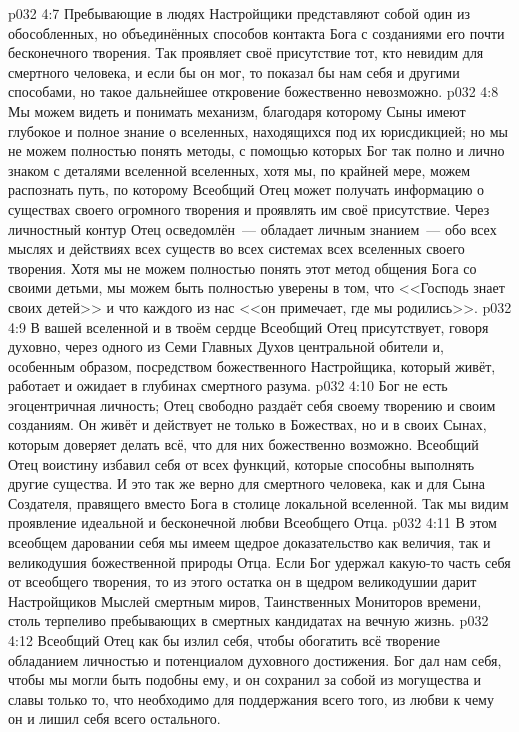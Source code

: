 \vs p032 4:7 Пребывающие в людях Настройщики представляют собой один из обособленных, но объединённых способов контакта Бога с созданиями его почти бесконечного творения. Так проявляет своё присутствие тот, кто невидим для смертного человека, и если бы он мог, то показал бы нам себя и другими способами, но такое дальнейшее откровение божественно невозможно.
\vs p032 4:8 Мы можем видеть и понимать механизм, благодаря которому Сыны имеют глубокое и полное знание о вселенных, находящихся под их юрисдикцией; но мы не можем полностью понять методы, с помощью которых Бог так полно и лично знаком с деталями вселенной вселенных, хотя мы, по крайней мере, можем распознать путь, по которому Всеобщий Отец может получать информацию о существах своего огромного творения и проявлять им своё присутствие. Через личностный контур Отец осведомлён~--- обладает личным знанием~--- обо всех мыслях и действиях всех существ во всех системах всех вселенных своего творения. Хотя мы не можем полностью понять этот метод общения Бога со своими детьми, мы можем быть полностью уверены в том, что <<Господь знает своих детей>> и что каждого из нас <<он примечает, где мы родились>>.
\vs p032 4:9 \pc В вашей вселенной и в твоём сердце Всеобщий Отец присутствует, говоря духовно, через одного из Семи Главных Духов центральной обители и, особенным образом, посредством божественного Настройщика, который живёт, работает и ожидает в глубинах смертного разума.
\vs p032 4:10 \pc Бог не есть эгоцентричная личность; Отец свободно раздаёт себя своему творению и своим созданиям. Он живёт и действует не только в Божествах, но и в своих Сынах, которым доверяет делать всё, что для них божественно возможно. Всеобщий Отец воистину избавил себя от всех функций, которые способны выполнять другие существа. И это так же верно для смертного человека, как и для Сына Создателя, правящего вместо Бога в столице локальной вселенной. Так мы видим проявление идеальной и бесконечной любви Всеобщего Отца.
\vs p032 4:11 В этом всеобщем даровании себя мы имеем щедрое доказательство как величия, так и великодушия божественной природы Отца. Если Бог удержал какую\hyp{}то часть себя от всеобщего творения, то из этого остатка он в щедром великодушии дарит Настройщиков Мыслей смертным миров, Таинственных Мониторов времени, столь терпеливо пребывающих в смертных кандидатах на вечную жизнь.
\vs p032 4:12 Всеобщий Отец как бы излил себя, чтобы обогатить всё творение обладанием личностью и потенциалом духовного достижения. Бог дал нам себя, чтобы мы могли быть подобны ему, и он сохранил за собой из могущества и славы только то, что необходимо для поддержания всего того, из любви к чему он и лишил себя всего остального.
